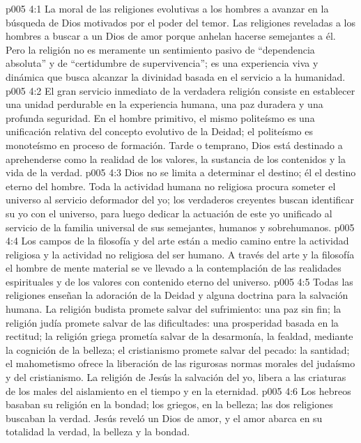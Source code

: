 \vs p005 4:1 La moral de las religiones evolutivas  a los hombres a avanzar en la búsqueda de Dios motivados por el poder del temor. Las religiones reveladas  a los hombres a buscar a un Dios de amor porque anhelan hacerse semejantes a él. Pero la religión no es meramente un sentimiento pasivo de “dependencia absoluta” y de “certidumbre de supervivencia”; es una experiencia viva y dinámica que busca alcanzar la divinidad basada en el servicio a la humanidad.
\vs p005 4:2 El gran servicio inmediato de la verdadera religión consiste en establecer una unidad perdurable en la experiencia humana, una paz duradera y una profunda seguridad. En el hombre primitivo, el mismo politeísmo es una unificación relativa del concepto evolutivo de la Deidad; el politeísmo es monoteísmo en proceso de formación. Tarde o temprano, Dios está destinado a aprehenderse como la realidad de los valores, la sustancia de los contenidos y la vida de la verdad.
\vs p005 4:3 Dios no se limita a determinar el destino; él  el destino eterno del hombre. Toda la actividad humana no religiosa procura someter el universo al servicio deformador del yo; los verdaderos creyentes buscan identificar su yo con el universo, para luego dedicar la actuación de este yo unificado al servicio de la familia universal de sus semejantes, humanos y sobrehumanos.
\vs p005 4:4 \pc Los campos de la filosofía y del arte están a medio camino entre la actividad religiosa y la actividad no religiosa del ser humano. A través del arte y la filosofía el hombre de mente material se ve llevado a la contemplación de las realidades espirituales y de los valores con contenido eterno del universo.
\vs p005 4:5 \pc Todas las religiones enseñan la adoración de la Deidad y alguna doctrina para la salvación humana. La religión budista promete salvar del sufrimiento: una paz sin fin; la religión judía promete salvar de las dificultades: una prosperidad basada en la rectitud; la religión griega prometía salvar de la desarmonía, la fealdad, mediante la cognición de la belleza; el cristianismo promete salvar del pecado: la santidad; el mahometismo ofrece la liberación de las rigurosas normas morales del judaísmo y del cristianismo. La religión de Jesús  la salvación del yo, libera a las criaturas de los males del aislamiento en el tiempo y en la eternidad.
\vs p005 4:6 Los hebreos basaban su religión en la bondad; los griegos, en la belleza; las dos religiones buscaban la verdad. Jesús reveló un Dios de amor, y el amor abarca en su totalidad la verdad, la belleza y la bondad.
